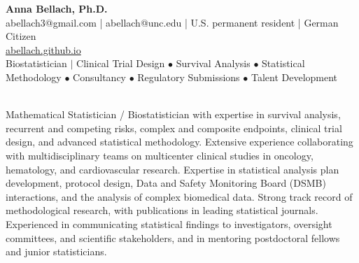 \documentclass[a4paper,11pt]{article}
\begin{document}
\begin{center}
	\LARGE{\bf Anna Bellach, Ph.D.}
	\\[1ex]
	\normalsize
	abellach3@gmail.com \hspace{0.1cm}|\hspace{0.1cm} abellach@unc.edu \hspace{0.1cm}|\hspace{0.1cm}
	U.S. permanent resident | German Citizen
	\\[0.5ex]
	\href{https://abellach.github.io}{abellach.github.io}
\\[1.2ex]
Biostatistician $|$ Clinical Trial Design $\bullet$ Survival Analysis $\bullet$  Statistical Methodology  $\bullet$ Consultancy $\bullet$ Regulatory Submissions $\bullet$ Talent Development
\end{center}
\\[-0.5ex]
Mathematical Statistician / Biostatistician with expertise in survival analysis, recurrent and competing risks, complex and composite endpoints, clinical trial design, and advanced statistical methodology. Extensive experience collaborating with multidisciplinary teams on multicenter clinical studies in oncology, hematology, and cardiovascular research. Expertise in statistical analysis plan development, protocol design, Data and Safety Monitoring Board (DSMB) interactions, and the analysis of complex biomedical data. Strong track record of methodological research, with publications in leading statistical journals. Experienced in communicating statistical findings to investigators, oversight committees, and scientific stakeholders, and in mentoring postdoctoral fellows and junior statisticians. 
\vspace{-0.4cm}
\end{document}
